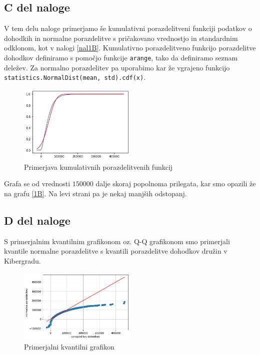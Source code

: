 \documentclass{article}
\begin{document}
\subsection{C del naloge}
V tem delu naloge primerjamo še kumulativni porazdelitveni funkciji podatkov o dohodkih in 
normalne porazdelitve s pričakovano vrednostjo in standardnim odklonom, kot v nalogi \ref{nal1B}.
Kumulativno porazdelitveno funkcijo porazdelitve dohodkov definiramo s pomočjo
funkcije \texttt{arange}, tako da definiramo seznam deležev. Za normalno porazdelitev pa uporabimo kar že vgrajeno funkcijo
\texttt{statistics.NormalDist(mean, std).cdf(x)}.
\begin{figure}[H]
    \begin{center}
        \includegraphics*[width=0.5\textwidth]{figure1C.png}
        \caption{Primerjava kumulativnih porazdelitvenih funkcij}
        \label{kumulativne}
    \end{center}
\end{figure}

Grafa se od vrednosti $150000$ dalje skoraj popolnoma prilegata,
kar smo opazili že na grafu \ref{1B}. Na levi strani pa je nekaj manjših odstopanj.


\subsection{D del naloge}
S primerjalnim kvantilnim grafikonom oz. Q-Q grafikonom smo primerjali kvantile normalne porazdelitve s kvantili 
porazdelitve dohodkov družin v Kibergradu.
\begin{figure}[H]
    \begin{center}
        \includegraphics*[width=0.5\textwidth]{figure1D.png}
        \caption{Primerjalni kvantilni grafikon}
        \label{QQ}
    \end{center}
\end{figure}
\end{document}
